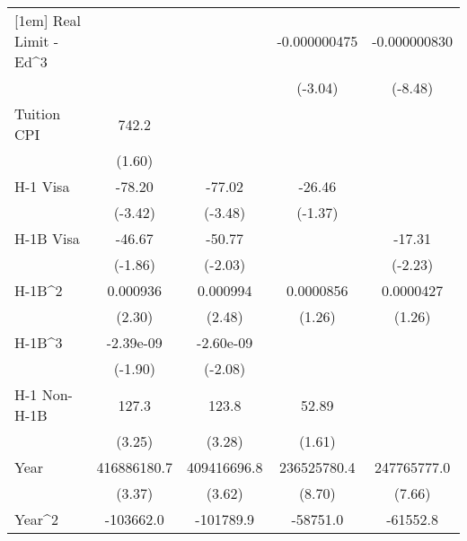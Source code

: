 {\begin{tabular}{l*{4}{c}}
[1em]
Real Limit - Ed^3        &                     &                     &-0.000000475\sym{**} &-0.000000830\sym{***}\\
                         &                     &                     &     (-3.04)         &     (-8.48)         \\
[1em]
Tuition CPI              &       742.2         &                     &                     &                     \\
                         &      (1.60)         &                     &                     &                     \\
[1em]
H-1 Visa                 &      -78.20\sym{**} &      -77.02\sym{**} &      -26.46         &                     \\
                         &     (-3.42)         &     (-3.48)         &     (-1.37)         &                     \\
[1em]
H-1B Visa                &      -46.67         &      -50.77         &                     &      -17.31\sym{*}  \\
                         &     (-1.86)         &     (-2.03)         &                     &     (-2.23)         \\
[1em]
H-1B^2                   &    0.000936\sym{*}  &    0.000994\sym{*}  &   0.0000856         &   0.0000427         \\
                         &      (2.30)         &      (2.48)         &      (1.26)         &      (1.26)         \\
[1em]
H-1B^3                   &   -2.39e-09         &   -2.60e-09         &                     &                     \\
                         &     (-1.90)         &     (-2.08)         &                     &                     \\
[1em]
H-1 Non-H-1B             &       127.3\sym{**} &       123.8\sym{**} &       52.89         &                     \\
                         &      (3.25)         &      (3.28)         &      (1.61)         &                     \\
[1em]
Year                     & 416886180.7\sym{**} & 409416696.8\sym{**} & 236525780.4\sym{***}& 247765777.0\sym{***}\\
                         &      (3.37)         &      (3.62)         &      (8.70)         &      (7.66)         \\
[1em]
Year^2                   &   -103662.0\sym{**} &   -101789.9\sym{**} &    -58751.0\sym{***}&    -61552.8\sym{***}\\

\end{tabular}}
